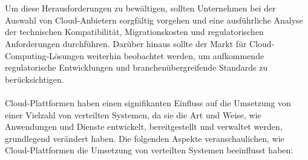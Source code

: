 \\\\
Um diese Herausforderungen zu bewältigen, sollten Unternehmen bei der Auswahl von Cloud-Anbietern sorgfältig vorgehen und eine ausführliche Analyse der technischen Kompatibilität, Migrationskosten und regulatorischen Anforderungen durchführen. Darüber hinaus sollte der Markt für Cloud-Computing-Lösungen weiterhin beobachtet werden, um aufkommende regulatorische Entwicklungen und branchenübergreifende Standards zu berücksichtigen.
\\\\
Cloud-Plattformen haben einen signifikanten Einfluss auf die Umsetzung von einer Vielzahl von verteilten Systemen, da sie die Art und Weise, wie Anwendungen und Dienste entwickelt, bereitgestellt und verwaltet werden, grundlegend verändert haben. Die folgenden Aspekte veranschaulichen, wie Cloud-Plattformen die Umsetzung von verteilten Systemen beeinflusst haben:
